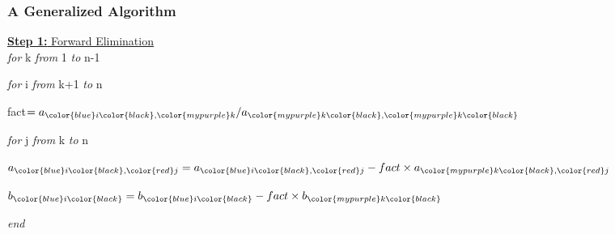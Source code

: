 \documentclass[fleqn]{beamer} %
\newcommand{\sectionIVsubsectionIIItitle}{A Generalized Algorithm}
\begin{document}
			\begin{frame}
				\frametitle{\sectionIVsubsectionIIItitle}
				\bigskip

				\begin{multicols}{2}
				\underline{{\bf Step 1:} Forward Elimination} \vspace{2mm}\\ 

		{\it for} \color{mypurple}k \color{black} {\it from} 1 {\it to} \color{mygreen}n\color{black}-1 \vspace{1mm}
	
		\hspace{3mm} {\it for} \color{blue}i \color{black} {\it from} \color{mypurple}k\color{black}+1 {\it to} \color{mygreen}n\color{black} \vspace{1mm}
		
		\hspace{6mm} fact$=a_{\color{blue}i\color{black},\color{mypurple}k}/a_{\color{mypurple}k\color{black},\color{mypurple}k\color{black}}$ \vspace{1mm}

		\hspace{9mm} {\it for} \color{red}j \color{black} {\it from} \color{mypurple} k \color{black}  {\it to} \color{mygreen}n\color{black} \vspace{1mm}

		\hspace{12mm} $a_{\color{blue}i\color{black},\color{red}j}=a_{\color{blue}i\color{black},\color{red}j}-fact\times a_{\color{mypurple}k\color{black},\color{red}j}$ \vspace{1mm}
		
\hspace{10mm}{\it end} \vspace{1mm}

\hspace*{9mm}$b_{\color{blue}i\color{black}}=b_{\color{blue}i\color{black}}-fact\times b_{\color{mypurple}k\color{black}}$ \vspace{1mm}

\hspace*{6mm}{\it end} \vspace{1mm}

{\it end}\vspace{15mm}
		

\end{multicols}
\end{frame}
\end{document}
